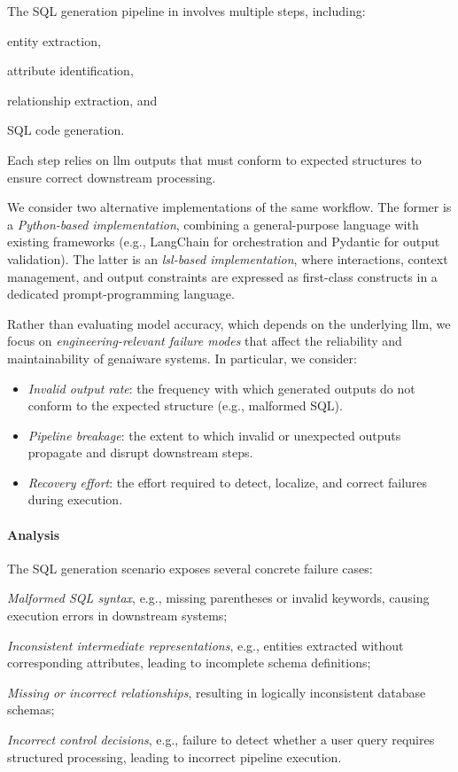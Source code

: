 \documentclass[manuscript,screen]{acmart}
\begin{document}
The SQL generation pipeline in  involves multiple steps, including:
\begin{enumerate*}[label=(\roman*)]
    \item entity extraction,
    \item attribute identification,
    \item relationship extraction, and
    \item SQL code generation.
\end{enumerate*}
Each step relies on \ac{llm} outputs that must conform to expected structures to ensure correct downstream processing.

We consider two alternative implementations of the same workflow.
The former is a \emph{Python-based implementation}, combining a general-purpose language with existing frameworks (e.g., LangChain for orchestration and Pydantic for output validation).
The latter is an \emph{\ac{lsl}-based implementation}, where interactions, context management, and output constraints are expressed as first-class constructs in a dedicated prompt-programming language.

Rather than evaluating model accuracy, which depends on the underlying \ac{llm}, we focus on \emph{engineering-relevant failure modes} that affect the reliability and maintainability of \ac{genai}ware systems. 
In particular, we consider:

\begin{itemize}
    \item \emph{Invalid output rate}: the frequency with which generated outputs do not conform to the expected structure (e.g., malformed SQL).
    \item \emph{Pipeline breakage}: the extent to which invalid or unexpected outputs propagate and disrupt downstream steps.
    \item \emph{Recovery effort}: the effort required to detect, localize, and correct failures during execution.
\end{itemize}

\paragraph{Analysis}

The SQL generation scenario exposes several concrete failure cases:
\begin{enumerate*}[label=(\roman*)]
    \item \emph{Malformed SQL syntax}, e.g., missing parentheses or invalid keywords, causing execution errors in downstream systems;
    \item \emph{Inconsistent intermediate representations}, e.g., entities extracted without corresponding attributes, leading to incomplete schema definitions;
    \item \emph{Missing or incorrect relationships}, resulting in logically inconsistent database schemas;
    \item \emph{Incorrect control decisions}, e.g., failure to detect whether a user query requires structured processing, leading to incorrect pipeline execution.
\end{enumerate*}
\end{document}
